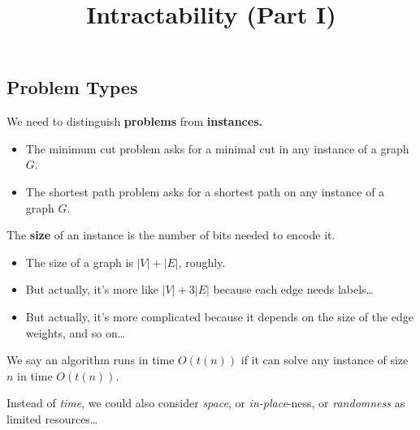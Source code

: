 \title{Intractability (Part I)}



\subsection{Problem Types}

We need to distinguish \textbf{problems} from \textbf{instances.}
\begin{itemize}
    \item The minimum cut problem asks for a minimal cut in any instance of a graph $G$.
    \item The shortest path problem asks for a shortest path on any instance of a graph $G$.
\end{itemize}
The \textbf{size} of an instance is the number of bits needed to encode it.
\begin{itemize}
    \item The size of a graph is $|V| + |E|$, roughly.
    \item But actually, it's more like $|V| + 3|E|$ because each edge needs labels\dots
    \item But actually, it's more complicated because it depends on the size of the edge weights, and so on\dots
\end{itemize}
We say an algorithm runs in time $O(t(n))$ if it can solve any instance of size $n$ in time $O(t(n))$.

\begin{remark}
    Instead of \emph{time}, we could also consider \emph{space}, or \emph{in-place}-ness, or \emph{randomness} as limited resources\dots
\end{remark}

